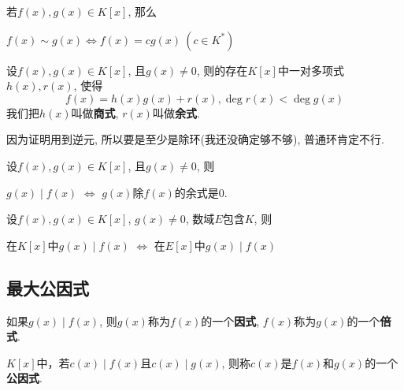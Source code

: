 \begin{Proposition}
若$f(x), g(x) \in K[x]$, 那么
\begin{tightcenter}
$f(x) \sim g(x) \iff f(x) = c g(x)~(c \in K^*)$
\end{tightcenter}
\end{Proposition}

\begin{Theorem}[带余除法]
设$f(x), g(x) \in K[x]$, 且$g(x) \neq 0$, 则\;\;的存在$K[x]$中一对多项式$h(x), r(x)$,
使得
\[
f(x) = h(x) g(x) + r(x), \deg r(x) < \deg g(x)
\]
我们把$h(x)$叫做\textbf{商式},
$r(x)$叫做\textbf{余式}.
\end{Theorem}

\begin{Note}
因为证明用到逆元, 所以要是至少是除环(我还没确定够不够), 普通环肯定不行.
\end{Note}

\begin{Corollary}
设$f(x), g(x) \in K[x]$, 且$g(x) \neq 0$, 则
\begin{tightcenter}
$g(x) \mid f(x)$ $\iff$ $g(x)$除$f(x)$的余式是$0$.
\end{tightcenter}
\end{Corollary}

\begin{Proposition}[整除性不随数域的扩大而改变]
设$f(x), g(x) \in K[x]$, $g(x) \neq 0$, 数域$E$包含$K$, 则
\begin{tightcenter}
在$K[x]$中$g(x) \mid f(x)$ $\iff$ 在$E[x]$中$g(x) \mid f(x)$ 
\end{tightcenter}
\end{Proposition}


\subsection{最大公因式}

\begin{Definition}[因式]
如果$g(x) \mid f(x)$, 则$g(x)$称为$f(x)$的一个\textbf{因式}, $f(x)$称为$g(x)$的一个\textbf{倍式}.
\end{Definition}

\begin{Definition}[公因式]
$K[x]$中，若$c(x) \mid f(x)$且$c(x) \mid g(x)$, 则称$c(x)$是$f(x)$和$g(x)$的一个\textbf{公因式}.
\end{Definition}

